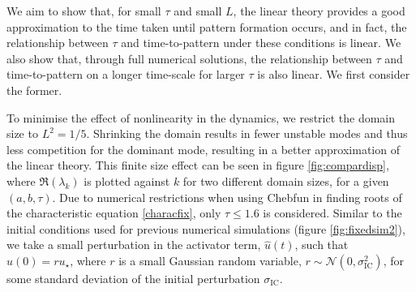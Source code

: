 We aim to show that, for small $\tau$ and small $L$, the linear theory provides a good approximation to the time taken until pattern formation occurs, and in fact, the relationship between $\tau$ and time-to-pattern under these conditions is linear. We also show that, through full numerical solutions, the relationship between $\tau$ and time-to-pattern on a longer time-scale for larger $\tau$ is also linear. We first consider the former.

To minimise the effect of nonlinearity in the dynamics, we restrict the domain size to $L^2=1/5$. Shrinking the domain results in fewer unstable modes and thus less competition for the dominant mode, resulting in a better approximation of the linear theory. This finite size effect can be seen in figure \ref{fig:compardisp}, where $\Re(\lambda_k)$ is plotted against $k$ for two different domain sizes, for a given $(a,b,\tau)$. Due to numerical restrictions when using Chebfun in finding roots of the characteristic equation \eqref{characfix}, only $\tau\leq1.6$ is considered. Similar to the initial conditions used for previous numerical simulations (figure \ref{fig:fixedsim2}), we take a small perturbation in the activator term, $\hat{u}(t)$, such that $\hat{u}(0)=ru_\star$, where $r$ is a small Gaussian random variable, $r\sim\mathcal{N}\left(0,\sigma_{\text{IC}}^2\right)$,
for some standard deviation of the initial perturbation $\sigma_{\text{IC}}$.

